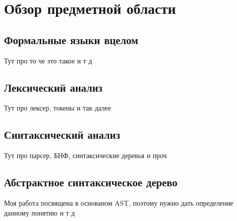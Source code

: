 \section{Обзор предметной области}
\subsection{Формальные языки вцелом}
Тут про то че это такое и т д

\subsection{Лексический анализ}
Тут про лексер, токены и так далее

\subsection{Синтаксический анализ}
Тут про парсер, БНФ, синтаксические деревья и проч

\subsection{Абстрактное синтаксическое дерево}
Моя работа посвящена в основаном AST, поэтому нужно дать определение данному понятию и т д
